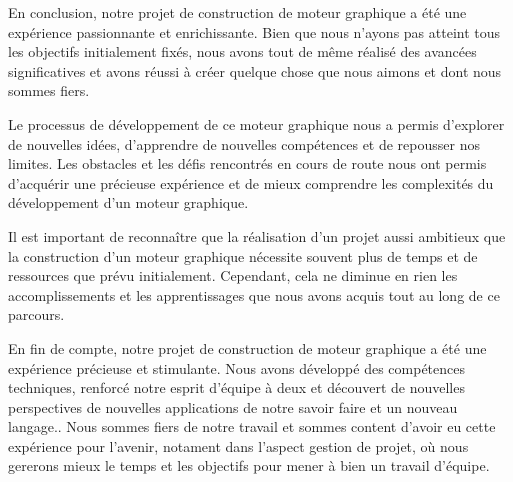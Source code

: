 
En conclusion, notre projet de construction de moteur graphique a été une expérience passionnante et enrichissante. Bien que nous n'ayons pas atteint tous les objectifs initialement fixés, nous avons tout de même réalisé des avancées significatives et avons réussi à créer quelque chose que nous aimons et dont nous sommes fiers.

Le processus de développement de ce moteur graphique nous a permis d'explorer de nouvelles idées, d'apprendre de nouvelles compétences et de repousser nos limites. Les obstacles et les défis rencontrés en cours de route nous ont permis d'acquérir une précieuse expérience et de mieux comprendre les complexités du développement d'un moteur graphique.

Il est important de reconnaître que la réalisation d'un projet aussi ambitieux que la construction d'un moteur graphique nécessite souvent plus de temps et de ressources que prévu initialement. Cependant, cela ne diminue en rien les accomplissements et les apprentissages que nous avons acquis tout au long de ce parcours.

En fin de compte, notre projet de construction de moteur graphique a été une expérience précieuse et stimulante. Nous avons développé des compétences techniques, renforcé notre esprit d'équipe à deux et découvert de nouvelles perspectives de nouvelles applications de notre savoir faire et un nouveau langage.. Nous sommes fiers de notre travail et sommes content d'avoir eu cette expérience pour l'avenir, notament dans l'aspect gestion de projet, où nous gererons mieux le temps et les objectifs pour mener à bien un travail d'équipe.
